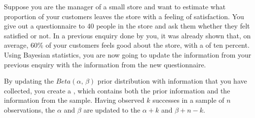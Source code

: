 \setcounter{section}{8}
\setcounter{subsection}{2}
\setcounter{question}{0}



Suppose you are the manager of a small store and want to estimate what proportion of your customers leaves the store with a feeling of satisfaction. You give out a questionnaire to 40 people in the store and ask them whether they felt satisfied or not. In a previous enquiry done by you, it was already shown that, on average, 60\% of your customers feels good about the store, with a  of ten percent. Using Bayesian statistics, you are now going to update the information from your previous enquiry with the information from the new questionnaire. \\



\onelineanswerbox


\emptyanswerbox{
    $\alpha$: \shortanswerline \hspace*{3cm} $\beta$: \shortanswerline
}


\rcodeanswertiny

By updating the $Beta(\alpha,\, \beta)$ prior distribution with information that you have collected, you create a , which contains both the prior information and the information from the sample. Having observed $k$ successes in a sample of $n$ observations, the  $\alpha$ and $\beta$ are updated to the  $\alpha + k$ and $\beta + n - k$. \\

